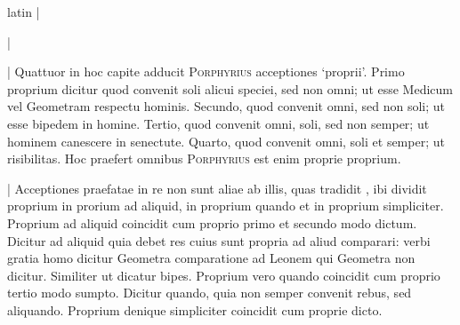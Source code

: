 \begin{otherlanguage*}{latin}
\pstart
 \textnormal{|}  
\pend

\pstart
 \textnormal{|}  
\pend

        \pstart
        \pend
      
\pstart
\noindent%
 \textnormal{|} Quattuor in hoc capite adducit \textsc{Porphyrius} acceptiones `proprii'. Primo proprium dicitur quod convenit soli alicui speciei, sed non omni; ut esse Medicum vel Geometram respectu hominis. Secundo, quod convenit omni, sed non soli; ut esse bipedem in homine. Tertio, quod convenit omni, soli, sed non semper; ut hominem canescere in senectute. Quarto, quod convenit omni, soli et semper; ut risibilitas. Hoc praefert omnibus \textsc{Porphyrius} est enim proprie proprium. 
\pend

        \pstart
        \pend
      
\pstart
\noindent%
 \textnormal{|} Acceptiones praefatae in re non sunt aliae ab illis, quas tradidit , ibi dividit proprium in prorium ad aliquid, in proprium quando et in proprium simpliciter. Proprium ad aliquid coincidit cum proprio primo et secundo modo dictum. Dicitur ad aliquid quia debet res cuius sunt propria ad aliud comparari: verbi gratia homo dicitur Geometra comparatione ad Leonem qui Geometra non dicitur. Similiter ut dicatur bipes. Proprium vero quando coincidit cum proprio tertio modo sumpto. Dicitur quando, quia non semper convenit rebus, sed aliquando. Proprium denique simpliciter coincidit cum proprie dicto. 
\pend


\end{otherlanguage*}
